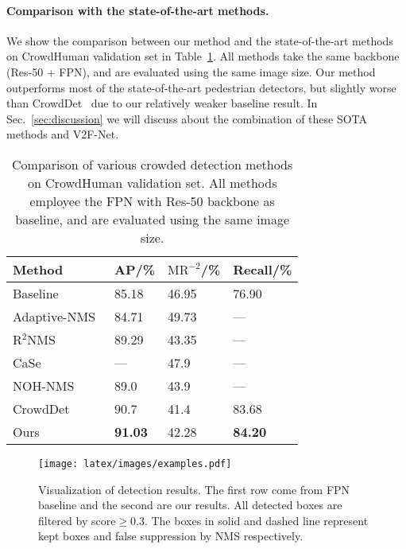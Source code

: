 \documentclass[10pt,twocolumn,letterpaper]{article}
\begin{document}
\paragraph{Comparison with the state-of-the-art methods.} We show the comparison between our method and the state-of-the-art methods on CrowdHuman validation set in Table~\ref{tbl:crowdhuman_eval}. All methods take the same backbone (Res-50 + FPN), and are evaluated using the same image size. Our method outperforms most of the state-of-the-art pedestrian detectors, but slightly worse than CrowdDet~\cite{chu2020crowddet} due to our relatively weaker baseline result. In Sec.~\ref{sec:discussion} we will discuss about the combination of these SOTA methods and V2F-Net.
\begin{table}[ht]
   \centering
   \footnotesize
   \caption{Comparison of various crowded detection methods on CrowdHuman validation set. All methods employee the FPN with Res-50 backbone as baseline, and are evaluated using the same image size.}
   \label{tbl:crowdhuman_eval}
   \begin{tabularx}{1.\linewidth}{p{40mm}<{\centering}|X<{\centering}X<{\centering}X<{\centering}}
   \toprule
       Method & AP/\% & $\text{MR}^{-2}$/\% & Recall/\%\\
       \hline
        Baseline & 85.18 & 46.95 & 76.90 \\
       \hline
       Adaptive-NMS~\cite{adaptiveNMS} & 84.71 & 49.73 & --- \\
       R$^2$NMS~\cite{huang2020R2nms} & 89.29 & 43.35 & --- \\
       CaSe~\cite{xie2020count} & --- & 47.9 & ---\\
       NOH-NMS~\cite{zhou2020NOH-NMS} & 89.0 & 43.9 & ---\\
       CrowdDet~\cite{chu2020crowddet} & 90.7 & 41.4 & 83.68 \\
       \hline
       Ours & \textbf{91.03} & 42.28  & \textbf{84.20}\\
       \bottomrule
   \end{tabularx}
\end{table}




\begin{figure*}[!t]
\begin{center}
 \texttt{[image: latex/images/examples.pdf]}
\end{center}
   \caption{Visualization of detection results. The first row come from FPN baseline and the second are our results. All detected boxes are filtered by score$\ge$0.3. The boxes in solid and dashed line represent kept boxes and false suppression by NMS respectively.}
\label{fig:example_cropped}
\end{figure*}
\end{document}
